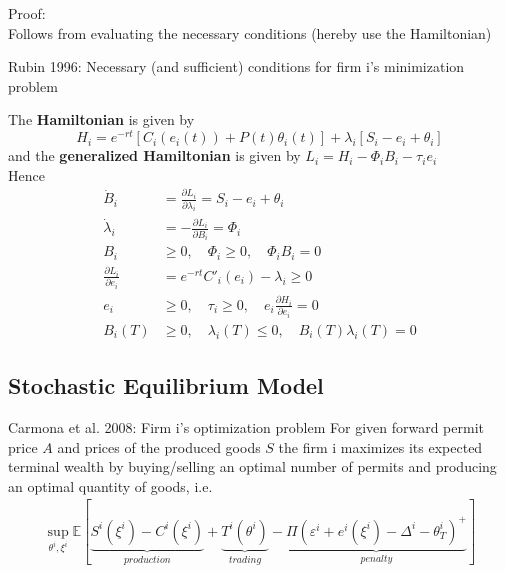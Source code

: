		Proof: \\
		Follows from evaluating the necessary conditions (hereby use the Hamiltonian)




Rubin 1996: Necessary (and sufficient) conditions for firm i's minimization problem
\begin{tiny}
	The \textbf{Hamiltonian} is given by
		\[
		H_i = e^{-rt} [C_i(e_i(t)) + P(t)\theta_i(t)] + \lambda_i[S_i - e_i + \theta_i]
		\]
	and the \textbf{generalized Hamiltonian} is given by
		$
		L_i = H_i  - \Phi_i B_i - \tau_i e_i
		$ \\
	Hence
		\begin{align}
		\dot{B}_i &= \frac{\partial L_i}{\partial \lambda_i} = S_i - e_i + \theta_i \\
		\dot{\lambda}_i &= -\frac{\partial L_i}{\partial B_i} = \Phi_i \\
		B_i &\ge 0, \quad \Phi_i \ge 0, \quad \Phi_i B_i = 0 \\
		\frac{\partial L_i}{\partial e_i} &= e^{-rt}C'_i(e_i) - \lambda_i \ge 0 \\
		e_i &\ge 0, \quad \tau_i \ge 0, \quad e_i \frac{\partial H_i}{\partial e_i} = 0 \\
		B_i(T) &\ge 0, \quad \lambda_i(T) \le 0, \quad B_i(T) \lambda_i(T) = 0
		\end{align}
\end{tiny}


\subsection{Stochastic Equilibrium Model}

Carmona et al. 2008: Firm i's optimization problem
	For given forward permit price $A$ and prices of the produced goods $S$ the firm i maximizes its expected 
	terminal wealth by  buying/selling an optimal number of permits and producing an optimal quantity of goods, i.e.
	\begin{align}
		\sup_{\theta^i, \xi^i} \mathbb{E} \left[ \underbrace{S^i(\xi^i) - C^i(\xi^i)}_{production} + 
		\underbrace{T^i(\theta^i)}_{trading} - \underbrace{\Pi \left(\varepsilon^i + e^i(\xi^i) - \Delta^i - \theta^i_T \right)^+}_{penalty} \right]
	\end{align}


